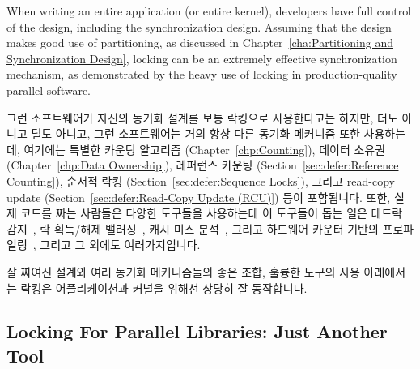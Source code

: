 When writing an entire application (or entire kernel), developers have
full control of the design, including the synchronization design.
Assuming that the design makes good use of partitioning, as discussed in
Chapter~\ref{cha:Partitioning and Synchronization Design}, locking
can be an extremely effective synchronization mechanism, as demonstrated
by the heavy use of locking in production-quality parallel software.
\fi

그런 소프트웨어가 자신의 동기화 설계를 보통 락킹으로 사용한다고는 하지만, 더도
아니고 덜도 아니고, 그런 소프트웨어는 거의 항상 다른 동기화 메커니즘 또한
사용하는데, 여기에는 특별한 카운팅 알고리즘 (Chapter~\ref{chp:Counting}),
데이터 소유권 (Chapter~\ref{chp:Data Ownership}),
레퍼런스 카운팅 (Section~\ref{sec:defer:Reference Counting}),
순서적 락킹 (Section~\ref{sec:defer:Sequence Locks}), 그리고
read-copy update (Section~\ref{sec:defer:Read-Copy Update (RCU)}) 등이
포함됩니다.
또한, 실제 코드를 짜는 사람들은 다양한 도구들을 사용하는데 이 도구들이 돕는
일은 데드락 감지~\cite{JonathanCorbet2006lockdep}, 락 획득/해제
밸러싱~\cite{JonathanCorbet2004sparse}, 캐시 미스 분석~\cite{ValgrindHomePage},
그리고 하드웨어 카운터 기반의
프로파일링~\cite{LinuxKernelPerfWiki,OProfileHomePage}, 그리고 그 외에도
여러가지입니다.

잘 짜여진 설계와 여러 동기화 메커니즘들의 좋은 조합, 훌륭한 도구의 사용
아래에서는 락킹은 어플리케이션과 커널을 위해선 상당히 잘 동작합니다.

\subsection{Locking For Parallel Libraries: Just Another Tool}
\label{sec:locking:Locking For Parallel Libraries: Just Another Tool}

